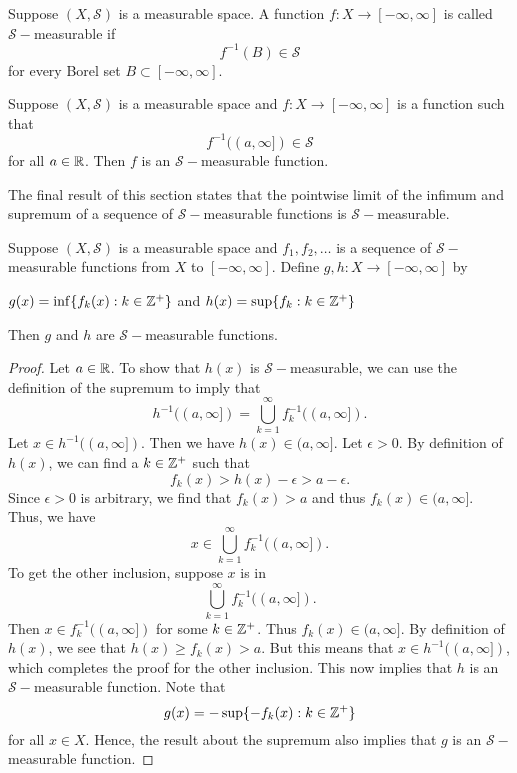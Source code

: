 \documentclass[11pt,a4paper]{book}
\begin{document}
\begin{definition}
    Suppose \( (X , \mathcal{S})  \) is a measurable space. A function \( f: X \to [-\infty , \infty ] \) is called \( \mathcal{S}- \)measurable if 
    \[  f^{-1}(B) \in \mathcal{S} \]
    for every Borel set \( B \subset [-\infty , \infty ] \).
\end{definition}

\begin{prop}
    Suppose \( (X,\mathcal{S}) \) is a measurable space and \( f: X \to [-\infty , \infty ] \) is a function such that
    \[  f^{-1}((a,\infty ]) \in \mathcal{S} \]
    for all \( a \in \mathbb{R}  \). Then \( f  \) is an \( \mathcal{S}- \)measurable function.
\end{prop}

The final result of this section states that the pointwise limit of the infimum and supremum of a sequence of \( \mathcal{S}- \)measurable functions is \( \mathcal{S}- \)measurable.
\begin{prop}
    Suppose \( (X , \mathcal{S})  \) is a measurable space and \( {f}_{1}, {f}_{2}, \dots  \) is a sequence of \( \mathcal{S}- \)measurable functions from \(X  \) to \( [-\infty , \infty ]  \). Define \( g,h: X \to [-\infty , \infty ] \) by
    \begin{center}
        \( g(x) = \inf \{ {f}_{k }(x)  : k \in \mathbb{Z}^{+} \}  \) and \( h(x) = \sup \{ {f}_{k}  : k \in \mathbb{Z}^{+}\}   \)
    \end{center}
    Then \( g  \) and \( h  \) are \( \mathcal{S}- \)measurable functions.
\end{prop}
\begin{proof}
Let \( a \in \mathbb{R}  \). To show that \( h(x) \) is \( \mathcal{S}- \)measurable, we can use the definition of the supremum to imply that 
\[  h^{-1}((a,\infty ]) = \bigcup_{  k = 1  }^{ \infty  } {f}_{k }^{-1}((a,\infty ]). \]
Let \( x \in h^{-1}((a,\infty ])  \). Then we have \( h(x) \in (a,\infty ] \). Let \( \epsilon > 0  \). By definition of \( h(x) \), we can find a \( k \in \mathbb{Z}^{+} \) such that 
\[  {f}_{k }(x) > h(x) - \epsilon > a -  \epsilon.    \]
Since \( \epsilon > 0  \) is arbitrary, we find that \( {f}_{k }(x) > a  \) and thus \( {f}_{k }(x) \in (a,\infty ] \). Thus, we have
\[  x \in \bigcup_{ k = 1  }^{ \infty  }  {f}_{k }^{-1}((a,\infty ]). \]
To get the other inclusion, suppose \( x  \) is in 
\[  \bigcup_{ k = 1  }^{ \infty   }  {f}_{k }^{-1}((a,\infty ]). \]
Then \( x \in {f}_{k}^{-1}((a,\infty ]) \) for some \( k \in \mathbb{Z}^{+} \). Thus \( {f}_{k }(x) \in (a,\infty ] \). By definition of \( h(x) \), we see that \( h(x) \geq {f}_{k }(x) > a  \). But this means that \( x \in h^{-1}((a,\infty ]) \), which completes the proof for the other inclusion. This now implies that \( h  \) is an \( \mathcal{S}- \)measurable function. Note that
\[  g(x) = - \sup \{ - {f}_{k }(x) : k \in \mathbb{Z}^{+} \}   \] for all \( x \in X  \). Hence, the result about the supremum also implies that \( g  \) is an \( \mathcal{S}- \)measurable function.
\end{proof}
\end{document}
